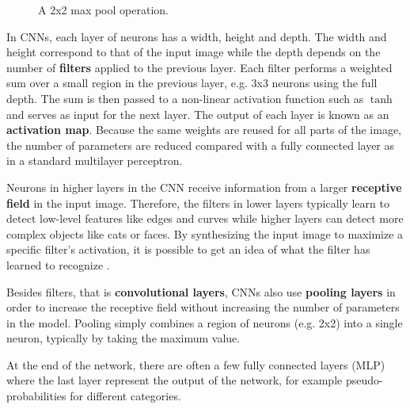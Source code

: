 
\begin{figure}
\centering
{}

\caption{A 2x2 max pool operation.}
\end{figure}

In CNNs, each layer of neurons has a width, height and depth. The width and height correspond to that of the input image while the depth depends on the number of \textbf{filters} applied to the previous layer.
Each filter performs a weighted sum over a small region in the previous layer, e.g. 3x3 neurons using the full depth. The sum is then passed to a non-linear activation function such as $\tanh$ and serves as input for the next layer. The output of each layer is known as an \textbf{activation map}.
Because the same weights are reused for all parts of the image, the number of parameters are reduced compared with a fully connected layer as in a standard multilayer perceptron.

Neurons in higher layers in the CNN receive information from a larger \textbf{receptive field} in the input image. Therefore, the filters in lower layers typically learn to detect low-level features like edges and curves while higher layers can detect more complex objects like cats or faces.
By synthesizing the input image to maximize a specific filter's activation, it is possible to get an idea of what the filter has learned to recognize \cite{VisualizeCnn}.

Besides filters, that is \textbf{convolutional layers}, CNNs also use \textbf{pooling layers} in order to increase the receptive field without increasing the number of parameters in the model.
Pooling simply combines a region of neurons (e.g. 2x2) into a single neuron, typically by taking the maximum value.

At the end of the network, there are often a few fully connected layers (MLP) where the last layer represent the output of the network, for example pseudo-probabilities for different categories.


